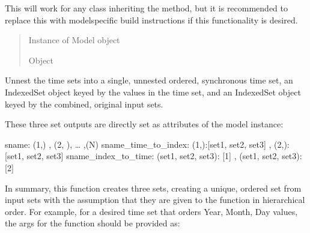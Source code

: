 \documentclass[letterpaper,10pt,english]{sphinxmanual}
\begin{document}
\begin{fulllineitems}
\begin{fulllineitems}
\sphinxAtStartPar
This will work for any class inheriting the method, but it is recommended to replace this
with model\sphinxhyphen{}specific build instructions if this functionality is desired.
\begin{quote}\begin{description}
\sphinxAtStartPar
Instance of Model object

\sphinxAtStartPar
Object

\end{description}\end{quote}

\end{fulllineitems}


\begin{fulllineitems}
\label{\detokenize{src.common.model:src.common.model.Model.declare_ordered_time_set}}
\pysigstartsignatures
\pysiglinewithargsret
{}
{\sphinxparamcomma {}\sphinxparamcomma {}}
{}
\pysigstopsignatures
\sphinxAtStartPar
Unnest the time sets into a single, unnested ordered, synchronous time set, an IndexedSet
object keyed by the values in the time set, and an IndexedSet object keyed by the combined,
original input sets.

\sphinxAtStartPar
These three set outputs are directly set as attributes of the model instance:

\sphinxAtStartPar
sname:               (1,) , (2, ), … ,(N)
sname\_time\_to\_index: (1,):{[}set1, set2, set3{]} , (2,):{[}set1, set2, set3{]}
sname\_index\_to\_time: (set1, set2, set3): {[}1{]} , (set1, set2, set3): {[}2{]}

\sphinxAtStartPar
In summary, this function creates three sets, creating a unique, ordered set from input sets
with the assumption that they are given to the function in hierarchical order. For example,
for a desired time set that orders Year, Month, Day values, the args for the function
should be provided as:


\end{fulllineitems}
\end{fulllineitems}
\end{document}
